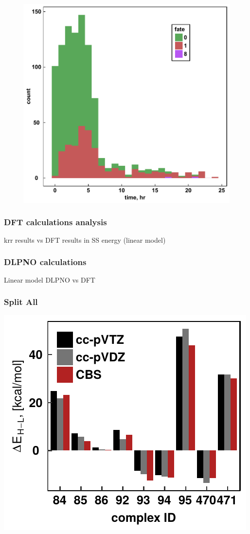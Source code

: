 \documentclass[xcolor=dvipsnames]{beamer}
\begin{document}
\begin{frame}
\begin{figure}[ht]
\begin{minipage}[b]{0.5\linewidth}
	\end{minipage}%
	\begin{minipage}[b]{0.5\linewidth}
		\centering
		\includegraphics[width=.6\linewidth]{img/timeByfate.pdf} 
	\end{minipage} 
\end{figure}
\end{frame}

\begin{frame}
\frametitle{DFT calculations analysis}
krr results vs DFT results in SS energy (linear model)
\end{frame}

\begin{frame}
\frametitle{DLPNO calculations}
Linear model DLPNO vs DFT
\end{frame}

\begin{frame}
\frametitle{Split All}
\includegraphics[width=.7\linewidth]{img/splitAllcomp.pdf} 
\end{frame}
\end{document}
